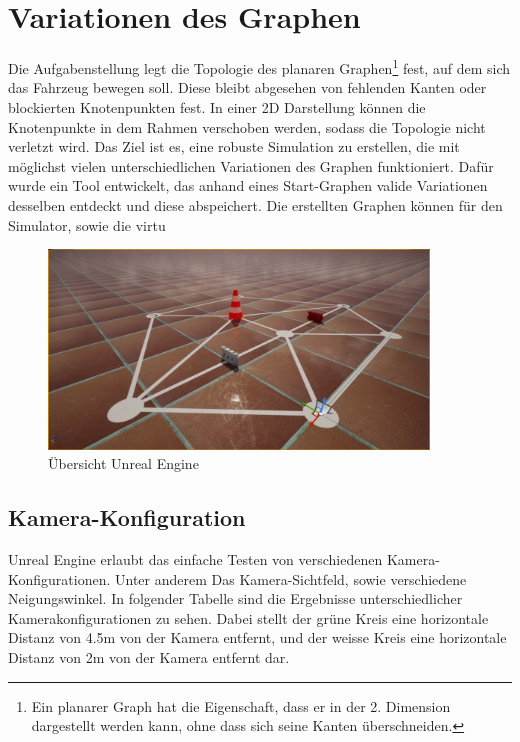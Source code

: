 \newpage
\section{Variationen des Graphen}
Die Aufgabenstellung legt die Topologie des planaren Graphen\footnote{Ein planarer Graph hat die Eigenschaft, dass er in der 2. Dimension dargestellt werden kann, ohne dass sich seine Kanten überschneiden.} fest, auf dem sich das Fahrzeug bewegen soll. Diese bleibt abgesehen von fehlenden Kanten oder blockierten Knotenpunkten fest. In einer 2D Darstellung können die Knotenpunkte in dem Rahmen verschoben werden, sodass die Topologie nicht verletzt wird. Das Ziel ist es, eine robuste Simulation zu erstellen, die mit möglichst vielen unterschiedlichen Variationen des Graphen funktioniert. Dafür wurde ein Tool entwickelt, das anhand eines Start-Graphen valide Variationen desselben entdeckt und diese abspeichert. Die erstellten Graphen können für den Simulator, sowie die virtu

\begin{figure}[h!]
            \centering
            \includegraphics[width=0.9\textwidth]{img/unrealengine/overview.png}
            \caption{Übersicht Unreal Engine}
        \label{img:Übersicht Unreal Engine}
        \end{figure}
\subsection{Kamera-Konfiguration}
Unreal Engine erlaubt das einfache Testen von verschiedenen Kamera-Konfigurationen. Unter anderem Das Kamera-Sichtfeld, sowie verschiedene Neigungswinkel. In folgender Tabelle sind die Ergebnisse unterschiedlicher Kamerakonfigurationen zu sehen. Dabei stellt der grüne Kreis eine horizontale Distanz von 4.5m von der Kamera entfernt, und der weisse Kreis eine horizontale Distanz von 2m von der Kamera entfernt dar.